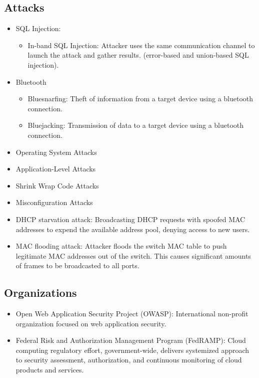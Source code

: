 \subsection{Attacks}
\begin{itemize}
    \item SQL Injection:
    \begin{itemize}
        \item In-band SQL Injection: Attacker uses the same communication channel to launch the attack and gather results. (error-based and union-based SQL injection).
    \end{itemize}
    \item Bluetooth
    \begin{itemize}
        \item Bluesnarfing: Theft of information from a target device using a bluetooth connection.
        \item Bluejacking: Transmission of data to a target device using a bluetooth connection.
    \end{itemize}
    \item Operating System Attacks
    \item Application-Level Attacks
    \item Shrink Wrap Code Attacks
    \item Misconfiguration Attacks
    \item DHCP starvation attack: Broadcasting DHCP requests with spoofed MAC addresses to expend the available address pool, denying access to new users.
    \item MAC flooding attack: Attacker floods the switch MAC table to push legitimate MAC addresses out of the switch. This causes significant amounts of frames to be broadcasted to all ports.
\end{itemize}

\subsection{Organizations}
\begin{itemize}
    \item Open Web Application Security Project (OWASP): International non-profit organization focused on web application security.
    \item Federal Risk and Authorization Management Program (FedRAMP): Cloud computing regulatory effort, government-wide, delivers systemized approach to security assessment, authorization, and continuous monitoring of cloud products and services.
\end{itemize}

